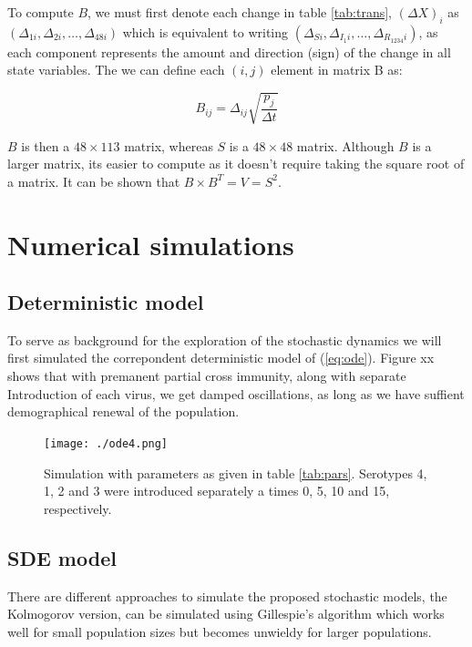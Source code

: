 \documentclass[12pt]{article}
\begin{document}
To compute $B$, we must first denote each change in table \ref{tab:trans}, 
$(\Delta X)_i$ as $(\Delta_{1i}, \Delta_{2i}, \ldots, \Delta_{48i})$ which is 
equivalent to writing $(\Delta_{Si}, \Delta_{I_1i}, \ldots, 
\Delta_{R_{1234}i})$, as each component represents the amount and direction 
(sign)  of the change in all state variables. The we can define each $(i,j)$ 
element in matrix B as:

\begin{equation}
 B_{ij} = \Delta_{ij}\sqrt{\frac{p_j}{\Delta t}}
\end{equation}

$B$ is then a $48 \times 113$ matrix, whereas $S$ is a $48 \times 48$ matrix. 
Although $B$ is a larger matrix, its easier to compute as it doesn't require 
taking the square root of a matrix. It can be shown that $B\times B^T = V = 
S^2$.

%


\section*{Numerical simulations}

\subsection*{Deterministic model}

To serve as background for the exploration of the stochastic dynamics we  will 
first simulated the correpondent deterministic model of (\ref{eq:ode}). Figure 
xx shows that with premanent partial cross immunity, along with separate 
Introduction of each virus, we get damped oscillations, as long as we have 
suffient demographical renewal of the population.

\begin{figure}
 \centering
 \texttt{[image: ./ode4.png]}
 \caption{Simulation with parameters as given in table \ref{tab:pars}. 
Serotypes 4, 1, 2 and 3 were introduced separately a times 0, 5, 10 and 15, 
respectively.}
 \label{fig:odesim4}
\end{figure}



\subsection*{SDE model}
There are different approaches to simulate the proposed stochastic  models, the 
Kolmogorov version, can be simulated using Gillespie's algorithm which works 
well for small population sizes but becomes unwieldy for larger populations. 
\end{document}
